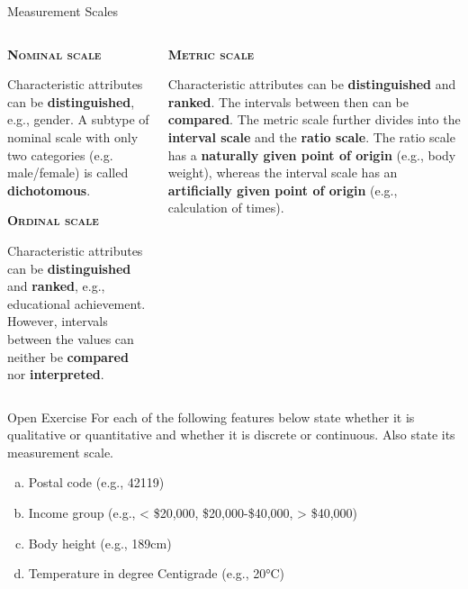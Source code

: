 \documentclass[main.tex]{subfiles}
\begin{document}
    \begin{frame}{Measurement Scales}
        \begin{columns}
            \begin{column}[t]{.45\textwidth}
                \begin{justify}
                    \alert{\textbf{\textsc{Nominal scale}}}
                    
                    Characteristic attributes can be \textbf{distinguished}, e.g., gender. A subtype of nominal scale with only two categories (e.g. male/female) is called \textbf{dichotomous}. 
                    \vspace*{4mm}
                    
                    \alert{\textbf{\textsc{Ordinal scale}}}
                    
                    Characteristic attributes can be \textbf{distinguished} and \textbf{ranked}, e.g., educational achievement. However, intervals between the values can neither be \textbf{compared} nor \textbf{interpreted}.
                \end{justify}
            \end{column}
            \begin{column}[t]{.45\textwidth}
                \begin{justify}
                    \alert{\textbf{\textsc{Metric scale}}}
                    
                    Characteristic attributes can be \textbf{distinguished} and \textbf{ranked}. The intervals between then can be \textbf{compared}. The metric scale further divides into the \textbf{interval scale} and the \textbf{ratio scale}. The ratio scale has a \textbf{naturally given point of origin} (e.g., body weight), whereas the interval scale has an \textbf{artificially given point of origin} (e.g., calculation of times).
                \end{justify}
            \end{column}
        \end{columns}
    \end{frame}	

    \begin{frame}{Open Exercise }
        For each of the following features below state whether it is qualitative or quantitative and whether it is discrete or continuous. Also state its measurement scale.
        
        \begin{enumerate}[a)]
            \item Postal code (e.g., 42119)
            \item Income group (e.g., < \$20,000, \$20,000-\$40,000, > \$40,000)
            \item Body height (e.g., 189cm)
            \item Temperature in degree Centigrade (e.g., 20°C)
        \end{enumerate}
    \end{frame}	

\end{document}

